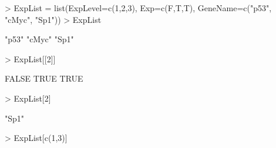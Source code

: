 \documentclass[12pt]{article}
\begin{document}
\begin{Schunk}
\begin{Sinput}
> ExpList = list(ExpLevel=c(1,2,3), Exp=c(F,T,T), GeneName=c("p53", "cMyc", "Sp1"))
> ExpList
\end{Sinput}
\begin{Soutput}
[1] "p53"  "cMyc" "Sp1" 
\end{Soutput}
\begin{Sinput}
> ExpList[[2]]
\end{Sinput}
\begin{Soutput}
[1] FALSE  TRUE  TRUE
\end{Soutput}
\begin{Sinput}
> ExpList[2]
\end{Sinput}
\begin{Soutput}
[1] "Sp1"
\end{Soutput}
\begin{Sinput}
> ExpList[c(1,3)]
\end{Sinput}
\end{Schunk}
\end{document}
